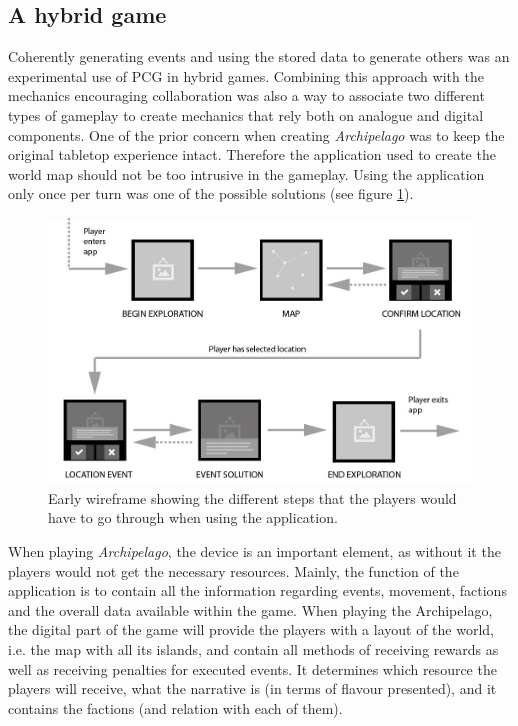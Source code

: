 \subsection{A hybrid game}
Coherently generating events and using the stored data to generate others was an experimental use of PCG in hybrid games. Combining this approach with the mechanics encouraging collaboration was also a way to associate two different types of gameplay to create mechanics that rely both on analogue and digital components. One of the prior concern when creating \textit{Archipelago} was to keep the original tabletop experience intact. Therefore the application used to create the world map should not be too intrusive in the gameplay. Using the application only once per turn was one of the possible solutions (see figure \ref{fig:wireframe}).

\begin{figure}[!ht]
    \centering
    \includegraphics[width=\textwidth]{Images/wire.jpg}
    \caption{Early wireframe showing the different steps that the players would have to go through when using the application.}
    \label{fig:wireframe}
\end{figure}

When playing \textit{Archipelago}, the device is an important element, as without it the players would not get the necessary resources.
Mainly, the function of the application is to contain all the information regarding events, movement, factions and the overall data available within the game. 
When playing the Archipelago, the digital part of the game will provide the players with a layout of the world, i.e. the map with all its islands, and contain all methods of receiving rewards as well as receiving penalties for executed events. It determines which resource the players will receive, what the narrative is (in terms of flavour presented), and it contains the factions (and relation with each of them).

